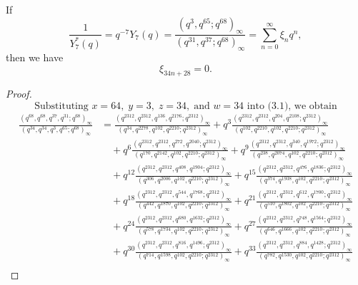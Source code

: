 \documentclass[10pt,a4paper]{amsart}
\begin{document}
	\begin{theorem}
		If
		\[
		\frac{1}{Y_7^*(q)} = q^{-7} Y_7(q)
		= \frac{(q^{3}, q^{65}; q^{68})_\infty}{(q^{31}, q^{37}; q^{68})_\infty}
		= \sum_{n=0}^{\infty} \xi_n q^n,
		\]
		then we have
		\[
		\xi_{34n+28} = 0.
		\]
	\end{theorem}

	\begin{proof}
			\[
		\text{Substituting } x = 64,\; y = 3,\; z = 34,\; \text{and } w = 34 \text{ into (3.1), we obtain}
		\]
		\[
		\begin{aligned}
			\frac{(q^{68}, q^{68}, q^{37}, q^{31}; q^{68})_{\infty}} 
			{(q^{34}, q^{34}, q^{3}, q^{65}; q^{68})_{\infty}} 
			&= \frac{(q^{2312}, q^{2312}, q^{136}, q^{2176}; q^{2312})_{\infty}}
			{(q^{34}, q^{2278}, q^{102}, q^{2210}; q^{2312})_{\infty}}
			+ q^{3}\frac{(q^{2312}, q^{2312}, q^{204}, q^{2108}; q^{2312})_{\infty}}
			{(q^{102}, q^{2210}, q^{102}, q^{2210}; q^{2312})_{\infty}} \\
			&\quad + q^{6}\frac{(q^{2312}, q^{2312}, q^{272}, q^{2040}; q^{2312})_{\infty}}
			{(q^{170}, q^{2142}, q^{102}, q^{2210}; q^{2312})_{\infty}}
			+ q^{9}\frac{(q^{2312}, q^{2312}, q^{340}, q^{1972}; q^{2312})_{\infty}}
			{(q^{238}, q^{2074}, q^{102}, q^{2210}; q^{2312})_{\infty}} \\
			&\quad + q^{12}\frac{(q^{2312}, q^{2312}, q^{408}, q^{1904}; q^{2312})_{\infty}}
			{(q^{306}, q^{2006}, q^{102}, q^{2210}; q^{2312})_{\infty}}
			+ q^{15}\frac{(q^{2312}, q^{2312}, q^{476}, q^{1836}; q^{2312})_{\infty}}
			{(q^{374}, q^{1938}, q^{102}, q^{2210}; q^{2312})_{\infty}} \\
			&\quad + q^{18}\frac{(q^{2312}, q^{2312}, q^{544}, q^{1768}; q^{2312})_{\infty}}
			{(q^{442}, q^{1870}, q^{102}, q^{2210}; q^{2312})_{\infty}} 
			+ q^{21}\frac{(q^{2312}, q^{2312}, q^{612}, q^{1700}; q^{2312})_{\infty}}
			{(q^{510}, q^{1802}, q^{102}, q^{2210}; q^{2312})_{\infty}} \\
			&\quad + q^{24}\frac{(q^{2312}, q^{2312}, q^{680}, q^{1632}; q^{2312})_{\infty}}
			{(q^{578}, q^{1734}, q^{102}, q^{2210}; q^{2312})_{\infty}}
			+ q^{27}\frac{(q^{2312}, q^{2312}, q^{748}, q^{1564}; q^{2312})_{\infty}}
			{(q^{646}, q^{1666}, q^{102}, q^{2210}; q^{2312})_{\infty}} \\
			&\quad + q^{30}\frac{(q^{2312}, q^{2312}, q^{816}, q^{1496}; q^{2312})_{\infty}}
			{(q^{714}, q^{1598}, q^{102}, q^{2210}; q^{2312})_{\infty}}
			+ q^{33}\frac{(q^{2312}, q^{2312}, q^{884}, q^{1428}; q^{2312})_{\infty}}
			{(q^{782}, q^{1530}, q^{102}, q^{2210}; q^{2312})_{\infty}} \\

\end{aligned}\]
\end{proof}
\end{document}
